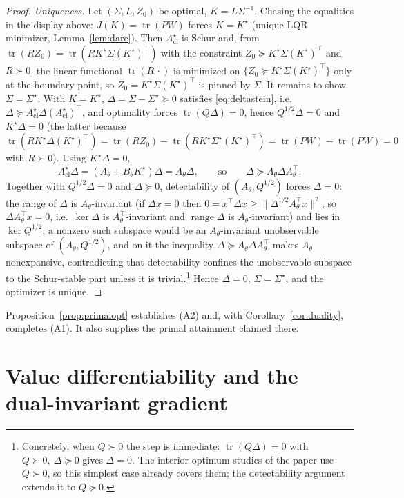 \documentclass[11pt]{article}
\theoremstyle{definition}
\DeclareMathOperator{\tr}{tr}
\DeclareMathOperator{\range}{range}
\newcommand{\Acl}{A_{\mathrm{cl}}}
\newcommand{\Th}{\theta}
\newcommand{\half}{{1/2}}
\newcommand{\Sig}{\Sigma}
\begin{document}
\begin{proof}
\emph{Uniqueness.} Let $(\Sig,L,Z_0)$ be optimal, $K=L\Sig^{-1}$. Chasing the
equalities in the display above: $J(K)=\tr(PW)$ forces $K=K^\star$ (unique LQR
minimizer, Lemma~\ref{lem:dare}). Then $\Acl^\star$ is Schur and, from
$\tr(RZ_0)=\tr(RK^\star\Sig(K^\star)^\top)$ with the constraint
$Z_0\succeq K^\star\Sig(K^\star)^\top$ and $R\succ0$, the linear functional
$\tr(R\,\cdot)$ is minimized on $\{Z_0\succeq K^\star\Sig(K^\star)^\top\}$ only at
the boundary point, so $Z_0=K^\star\Sig(K^\star)^\top$ is pinned by $\Sig$.
It remains to show $\Sig=\Sig^\star$. With $K=K^\star$, $\Delta=\Sig-\Sig^\star
\succeq0$ satisfies \eqref{eq:deltastein}, i.e.\
$\Delta\succeq\Acl^\star\Delta(\Acl^\star)^\top$, and optimality forces
$\tr(Q\Delta)=0$, hence $Q^{\half}\Delta=0$ and $K^\star\Delta=0$ (the latter
because $\tr(RK^\star\Delta(K^\star)^\top)=\tr(RZ_0)-\tr(RK^\star\Sig^\star
(K^\star)^\top)=\tr(PW)-\tr(PW)=0$ with $R\succ0$). Using $K^\star\Delta=0$,
\[
\Acl^\star\Delta=(A_\Th+B_\Th K^\star)\Delta=A_\Th\Delta,
\qquad\text{so}\qquad
\Delta\succeq A_\Th\Delta A_\Th^\top .
\]
Together with $Q^{\half}\Delta=0$ and $\Delta\succeq0$, detectability of
$(A_\Th,Q^{\half})$ forces $\Delta=0$: the range of $\Delta$ is
$A_\Th$-invariant (if $\Delta x=0$ then $0=x^\top\Delta x\ge\|\Delta^{\half}
A_\Th^\top x\|^2$, so $\Delta A_\Th^\top x=0$, i.e.\ $\ker\Delta$ is
$A_\Th^\top$-invariant and $\range\Delta$ is $A_\Th$-invariant) and lies in
$\ker Q^{\half}$; a nonzero such subspace would be an $A_\Th$-invariant
unobservable subspace of $(A_\Th,Q^{\half})$, and on it the inequality
$\Delta\succeq A_\Th\Delta A_\Th^\top$ makes $A_\Th$ nonexpansive, contradicting
that detectability confines the unobservable subspace to the Schur-stable
part unless it is trivial.\footnote{Concretely, when $Q\succ0$ the step is
immediate: $\tr(Q\Delta)=0$ with $Q\succ0,\ \Delta\succeq0$ gives $\Delta=0$.
The interior-optimum studies of the paper use $Q\succ0$, so this simplest case
already covers them; the detectability argument extends it to $Q\succeq0$.}
Hence $\Delta=0$, $\Sig=\Sig^\star$, and the optimizer is unique.
\end{proof}

Proposition~\ref{prop:primalopt} establishes (A2) and, with
Corollary~\ref{cor:duality}, completes (A1). It also supplies the primal
attainment claimed there.

\section{Value differentiability and the dual-invariant gradient}\label{sec:diff}
\end{document}
